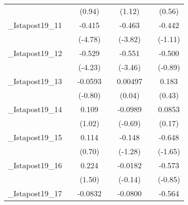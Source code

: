 {\begin{tabular}{l*{6}{c}}
            &                     &      (0.94)         &                     &      (1.12)         &                     &      (0.56)         \\
[1em]
\_Istapost19\_11&                     &      -0.415\sym{***}&                     &      -0.463\sym{***}&                     &      -0.442         \\
            &                     &     (-4.78)         &                     &     (-3.82)         &                     &     (-1.11)         \\
[1em]
\_Istapost19\_12&                     &      -0.529\sym{***}&                     &      -0.551\sym{**} &                     &      -0.500         \\
            &                     &     (-4.23)         &                     &     (-3.46)         &                     &     (-0.89)         \\
[1em]
\_Istapost19\_13&                     &     -0.0593         &                     &     0.00497         &                     &       0.183         \\
            &                     &     (-0.80)         &                     &      (0.04)         &                     &      (0.43)         \\
[1em]
\_Istapost19\_14&                     &       0.109         &                     &     -0.0989         &                     &      0.0853         \\
            &                     &      (1.02)         &                     &     (-0.69)         &                     &      (0.17)         \\
[1em]
\_Istapost19\_15&                     &       0.114         &                     &      -0.148         &                     &      -0.648         \\
            &                     &      (0.70)         &                     &     (-1.28)         &                     &     (-1.65)         \\
[1em]
\_Istapost19\_16&                     &       0.224         &                     &     -0.0182         &                     &      -0.573         \\
            &                     &      (1.50)         &                     &     (-0.14)         &                     &     (-0.85)         \\
[1em]
\_Istapost19\_17&                     &     -0.0832         &                     &     -0.0800         &                     &      -0.564\sym{*}  \\

\end{tabular}}
